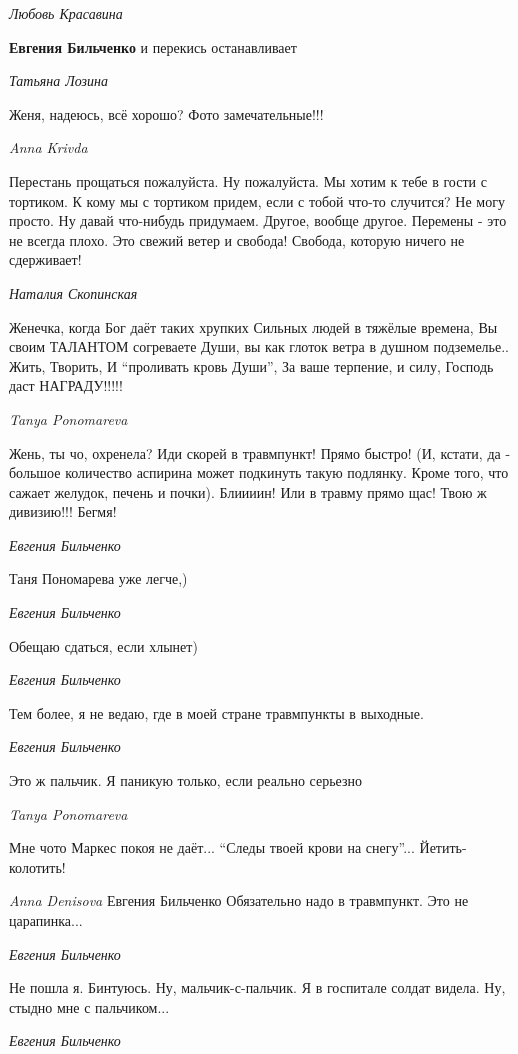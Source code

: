\emph{Любовь Красавина}

\textbf{Евгения Бильченко} и перекись останавливает

\emph{Татьяна Лозина}

Женя, надеюсь, всё хорошо?
Фото замечательные!!!

\emph{Anna Krivda}

Перестань прощаться пожалуйста. Ну пожалуйста. Мы хотим к тебе в гости с
тортиком. К кому мы с тортиком придем, если с тобой что-то случится? Не могу
просто. Ну давай что-нибудь придумаем. Другое, вообще другое. Перемены - это не
всегда плохо. Это свежий ветер и свобода! Свобода, которую ничего не
сдерживает!

\emph{Наталия Скопинская}

Женечка, когда Бог даёт таких хрупких Сильных людей в тяжёлые времена, Вы своим
ТАЛАНТОМ согреваете Души, вы как глоток ветра в душном подземелье.. Жить,
Творить, И \enquote{проливать кровь Души}, За ваше терпение, и силу, Господь даст
НАГРАДУ!!!!!

\emph{Tanya Ponomareva}

Жень, ты чо, охренела? Иди скорей в травмпункт! Прямо быстро! (И, кстати, да -
большое количество аспирина может подкинуть такую подлянку. Кроме того, что
сажает желудок, печень и почки). Блиииин! Или в травму прямо щас! Твою ж
дивизию!!! Бегмя!

\emph{Евгения Бильченко}

Таня Пономарева уже легче,)

\emph{Евгения Бильченко}

Обещаю сдаться, если хлынет)

\emph{Евгения Бильченко}

Тем более, я не ведаю, где в моей стране травмпункты в выходные.

\emph{Евгения Бильченко}

Это ж пальчик. Я паникую только, если реально серьезно

\emph{Tanya Ponomareva}

Мне чото Маркес покоя не даёт... \enquote{Следы твоей крови на снегу}... Йетить-колотить!

\emph{Anna Denisova}
Евгения Бильченко Обязательно надо в травмпункт. Это не царапинка...

\emph{Евгения Бильченко}

Не пошла я. Бинтуюсь. Ну, мальчик-с-пальчик. Я в госпитале солдат видела. Ну,
стыдно мне с пальчиком...

\emph{Евгения Бильченко}

